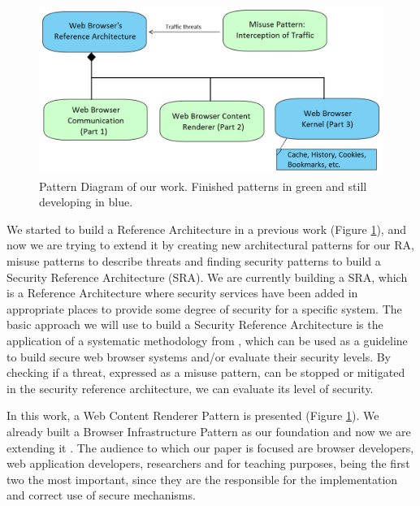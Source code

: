 \documentclass[prodmode,acmtecs]{acmsmall}
\begin{document}
    \begin{figure}[h!t]
      \vspace*{-0.5cm}
      \centering
      \hspace{0.5cm}\includegraphics[scale=0.42]{figures/relations-finish.png}
      \caption{Pattern Diagram of our work. Finished patterns in green and still developing in blue.}
      \label{fig:relations}
    \end{figure}

We started to build a Reference Architecture in a previous work (Figure \ref{fig:relations}), and now we are trying to extend it by creating new architectural patterns for our RA, misuse patterns to describe threats and finding security patterns to build a Security Reference Architecture (SRA). We are currently building a SRA, which is a Reference Architecture where security services have been added in appropriate places to provide some degree of security for a specific system. The basic approach we will use to build a Security Reference Architecture is the application of a systematic methodology from \cite{fernandez2006methodology,Fernandez2011,Fernandez2015}, which can be used as a guideline to build secure web browser systems and/or evaluate their security levels. By checking if a threat, expressed as a misuse pattern, can be stopped or mitigated in the security reference architecture, we can evaluate its level of security.

In this work, a Web Content Renderer Pattern is presented (Figure \ref{fig:relations}). We already built a Browser Infrastructure Pattern as our foundation and now we are extending it \cite{silva2015}. The audience to which our paper is focused are browser developers, web application developers, researchers and for teaching purposes, being the first two the most important, since they are the responsible for the implementation and correct use of secure mechanisms. 
\end{document}
